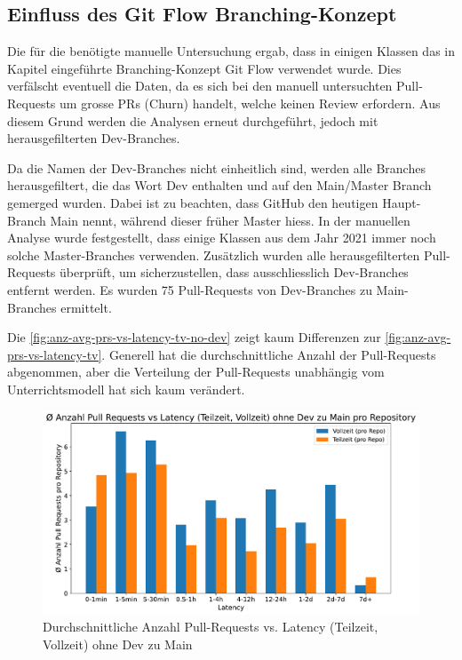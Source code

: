 \subsection{Einfluss des Git Flow Branching-Konzept}
Die für die  benötigte manuelle Untersuchung ergab, dass in einigen Klassen das in Kapitel  eingeführte Branching-Konzept Git Flow verwendet wurde. Dies verfälscht eventuell die Daten, da es sich bei den manuell untersuchten Pull-Requests um grosse PRs (Churn) handelt, welche keinen Review erfordern. Aus diesem Grund werden die Analysen erneut durchgeführt, jedoch mit herausgefilterten Dev-Branches.

Da die Namen der Dev-Branches nicht einheitlich sind, werden alle Branches herausgefiltert, die das Wort Dev enthalten und auf den Main/Master Branch gemerged wurden. Dabei ist zu beachten, dass GitHub den heutigen Haupt-Branch Main nennt, während dieser früher Master hiess. In der manuellen Analyse wurde festgestellt, dass einige Klassen aus dem Jahr 2021 immer noch solche Master-Branches verwenden. Zusätzlich wurden alle herausgefilterten Pull-Requests überprüft, um sicherzustellen, dass ausschliesslich Dev-Branches entfernt werden. Es wurden 75 Pull-Requests von Dev-Branches zu Main-Branches ermittelt.


Die \autoref{fig:anz-avg-prs-vs-latency-tv-no-dev} zeigt kaum Differenzen zur \autoref{fig:anz-avg-prs-vs-latency-tv}. Generell hat die durchschnittliche Anzahl der Pull-Requests abgenommen, aber die Verteilung der Pull-Requests unabhängig vom Unterrichtsmodell hat sich kaum verändert. 

\begin{figure}[htbp]
    \includegraphics[width=\textwidth]{Figures/anz-avg-prs-vs-latency-tv-no-dev.pdf}
    \caption{Durchschnittliche Anzahl Pull-Requests vs. Latency (Teilzeit, Vollzeit) ohne Dev zu Main}
    \label{fig:anz-avg-prs-vs-latency-tv-no-dev}
\end{figure}


